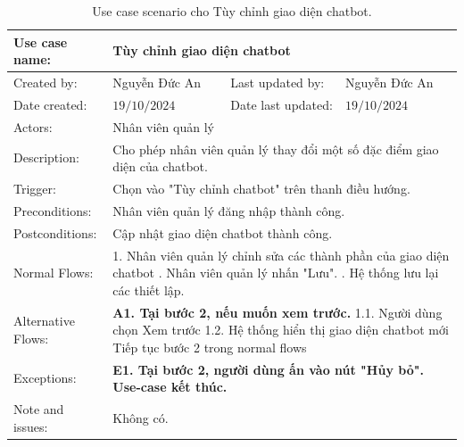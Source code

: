 \begin{table}[H]
	\centering
	\begin{tabular}{|l|l|l|l|} 
		\hline Use case name: & \multicolumn{3}{|l|}{Tùy chỉnh giao diện chatbot} \\ 
		\hline Created by: & Nguyễn Đức An & Last updated by: & Nguyễn Đức An \\ 
		\hline Date created: & $19 / 10 / 2024$ & Date last updated: & $19 / 10 / 2024$\\ 
		\hline Actors: & \multicolumn{3}{|l|}{ Nhân viên quản lý } \\ 
		\hline Description: & \multicolumn{3}{|p{12cm}|}{ Cho phép nhân viên quản lý thay đổi một số đặc điểm giao diện của chatbot. } \\ 
		\hline Trigger: & \multicolumn{3}{|p{12cm}|}{ Chọn vào "Tùy chỉnh chatbot" trên thanh điều hướng. } \\ 
		\hline Preconditions: & \multicolumn{3}{|p{12cm}|}{ 
			Nhân viên quản lý đăng nhập thành công. 
		} \\ 
		\hline Postconditions: & \multicolumn{3}{|p{12cm}|}{ 
			Cập nhật giao diện chatbot thành công. 
		} \\ 
		\hline Normal Flows: & \multicolumn{3}{|p{12cm}|}{ 
			1. Nhân viên quản lý chỉnh sửa các thành phần của giao diện chatbot \newline 
			2. Nhân viên quản lý nhấn "Lưu". \newline
			3. Hệ thống lưu lại các thiết lập.
		} \\ 
		\hline Alternative Flows: & \multicolumn{3}{|p{12cm}|}{ 
            \textbf{A1. Tại bước 2, nếu muốn xem trước.} \newline 
			\hspace{0.5cm}1.1. Người dùng chọn Xem trước \newline
            \hspace{0.5cm}1.2. Hệ thống hiển thị giao diện chatbot mới \newline
            \hspace{0.5cm}Tiếp tục bước 2 trong normal flows
         } \\ 
		\hline Exceptions: & \multicolumn{3}{|p{12cm}|}{ 
			\textbf{E1. Tại bước 2, người dùng ấn vào nút "Hủy bỏ". Use-case kết thúc.  }
		} \\ 
		\hline Note and issues: & \multicolumn{3}{|p{12cm}|}{ Không có. } \\ 
		\hline
	\end{tabular}
	\caption{Use case scenario cho Tùy chỉnh giao diện chatbot.}
\end{table}


